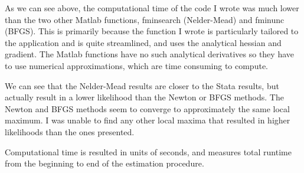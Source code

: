 \documentclass[11pt]{article} %
\begin{document}
As we can see above, the computational time of the code I wrote was much lower than the two other Matlab functions, fminsearch (Nelder-Mead) and fminunc (BFGS). This is primarily because the function I wrote is particularly tailored to the application and is quite streamlined, and uses the analytical hessian and gradient. The Matlab functions have no such analytical derivatives so they have to use numerical approximations, which are time consuming to compute.

We can see that the Nelder-Mead results are closer to the Stata results, but actually result in a lower likelihood than the Newton or BFGS methods. The Newton and BFGS methods seem to converge to approximately the same local maximum. I was unable to find any other local maxima that resulted in higher likelihoods than the ones presented.

Computational time is resulted in units of seconds, and measures total runtime from the beginning to end of the estimation procedure.
\end{document}
